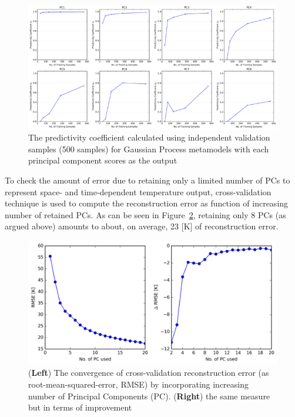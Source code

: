 \documentclass[11pt,titlepage]{article}
\begin{document}
\begin{figure}[h!]
	\centering
	\includegraphics[scale=0.95]{figures/gp_pc_conv.png}
	\caption{The predictivity coefficient calculated using independent 
		validation samples (500 samples) for Gaussian Process metamodels 
		with each principal component scores as the output}
	\label{fig:gp_pc_conv}
\end{figure}

To check the amount of error due to retaining only a limited number of PCs to 
represent space- and time-dependent temperature output, cross-validation 
technique is used to compute the reconstruction error as function of 
increasing number of retained PCs. As can be seen in Figure~\ref{fig:rmse}, retaining only 
8 PCs (as argued above) amounts to about, on average, 23 [K] of reconstruction 
error.

\begin{figure}[h!]
	\centering
	\includegraphics[scale=0.95]{figures/rmse.png}
	\caption{(\textbf{Left}) The convergence of cross-validation reconstruction
		 error (as root-mean-squared-error, RMSE) by incorporating increasing 
		 number of Principal Components (PC). (\textbf{Right}) the same 
		 measure but in terms of improvement}
	\label{fig:rmse}
\end{figure}
\end{document}
